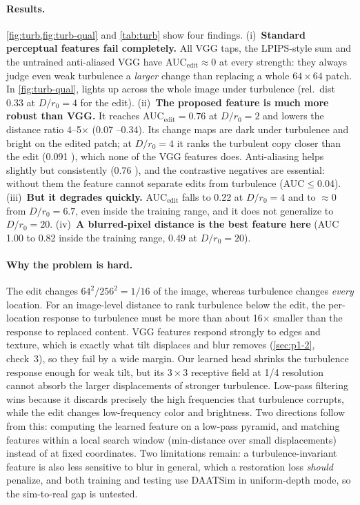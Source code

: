 \documentclass[10pt,twocolumn,letterpaper]{article}
\begin{document}
\paragraph{Results.}
\cref{fig:turb,fig:turb-qual} and \cref{tab:turb} show four findings.
(i)~\textbf{Standard perceptual features fail completely.} All VGG taps, the LPIPS-style sum and the untrained anti-aliased VGG have AUC$_\text{edit}\approx0$ at every strength: they always judge even weak turbulence a \emph{larger} change than replacing a whole $64{\times}64$ patch. In \cref{fig:turb-qual},  lights up across the whole image under turbulence (rel.\ dist 0.33 at $D/r_0{=}4$  for the edit).
(ii)~\textbf{The proposed feature is much more robust than VGG.} It reaches AUC$_\text{edit}=0.76$ at $D/r_0{=}2$ and lowers the distance ratio 4--5$\times$ (0.07 --0.34). Its change maps are dark under turbulence and bright on the edited patch; at $D/r_0{=}4$ it ranks the turbulent copy closer than the edit (0.091 ), which none of the VGG features does. Anti-aliasing helps slightly but consistently (0.76 ), and the contrastive negatives are essential: without them the feature cannot separate edits from turbulence (AUC$\le$0.04).
(iii)~\textbf{But it degrades quickly.} AUC$_\text{edit}$ falls to 0.22 at $D/r_0{=}4$ and to $\approx$0 from $D/r_0{=}6.7$, even inside the training range, and it does not generalize to $D/r_0{=}20$.
(iv)~\textbf{A blurred-pixel distance is the best feature here} (AUC 1.00 to 0.82 inside the training range, 0.49 at $D/r_0{=}20$).

\paragraph{Why the problem is hard.}
The edit changes $64^2/256^2=1/16$ of the image, whereas turbulence changes \emph{every} location. For an image-level distance to rank turbulence below the edit, the per-location response to turbulence must be more than about 16$\times$ smaller than the response to replaced content. VGG features respond strongly to edges and texture, which is exactly what tilt displaces and blur removes (\cref{sec:p1-2}, check~3), so they fail by a wide margin. Our learned head shrinks the turbulence response enough for weak tilt, but its $3{\times}3$ receptive field at 1/4 resolution cannot absorb the larger displacements of stronger turbulence. Low-pass filtering wins because it discards precisely the high frequencies that turbulence corrupts, while the edit changes low-frequency color and brightness. Two directions follow from this: computing the learned feature on a low-pass pyramid, and matching features within a local search window (min-distance over small displacements) instead of at fixed coordinates. Two limitations remain: a turbulence-invariant feature is also less sensitive to blur in general, which a restoration loss \emph{should} penalize, and both training and testing use DAATSim in uniform-depth mode, so the sim-to-real gap is untested.
\end{document}
